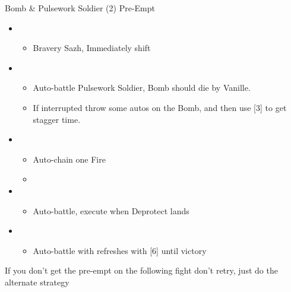 \documentclass{report}
\begin{document}
\begin{battle}{Bomb \& Pulsework Soldier (2) Pre-Empt}
\begin{itemize}
    \item \second
    \begin{itemize}
        \item Bravery Sazh, Immediately shift
    \end{itemize}
    \item \first
    \begin{itemize}
        \item Auto-battle Pulsework Soldier, Bomb should die by Vanille.
        \item If interrupted throw some autos on the Bomb, and then use [3] to get stagger time.
    \end{itemize}
    \item \fifth
    \begin{itemize}
        \item Auto-chain one Fire
        \item \stagger
    \end{itemize}
    \item \third
    \begin{itemize}
        \item Auto-battle, execute when Deprotect lands
    \end{itemize}
    \item \first
    \begin{itemize}
        \item Auto-battle with refreshes with [6] until victory
    \end{itemize}
\end{itemize}
\end{battle}

If you don't get the pre-empt on the following fight don't retry, just do the alternate strategy
\end{document}
